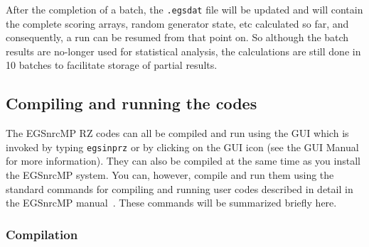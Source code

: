 \documentclass[12pt,twoside]{article}  %
\begin{document}
After the completion of a batch, the \verb+.egsdat+ file will be
updated and will contain the complete scoring arrays, random generator
state, etc calculated so far, and consequently, a run can be resumed
from that point on. So although the batch results are no-longer used for
statistical analysis, the calculations are still done in 10 batches to
facilitate storage of partial results.


\subsection{Compiling and running the codes}

The EGSnrcMP RZ codes can all be compiled and run using the
GUI which is invoked by typing {\tt egsinprz} or by clicking on the GUI icon
(see the GUI Manual~\cite{Ma03} for more information).
They can also be compiled at the same time as you install the EGSnrcMP
system.
You can, however, compile and run them using the standard
commands for compiling and running user codes described in detail
in the EGSnrcMP manual~\cite{Ka03}.  These commands will be summarized
briefly here.

\subsubsection{Compilation}
\label{compilesect}
\end{document}
